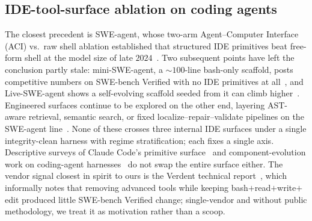 %
%

\subsection{IDE-tool-surface ablation on coding agents}
\label{sec:relwork-ide}

The closest precedent is SWE-agent, whose two-arm Agent--Computer
Interface (ACI) vs.\ raw shell ablation established that structured
IDE primitives beat free-form shell at the model size of late
$2024$~\cite{yang2024sweagent}. Two subsequent points have left the
conclusion partly stale: mini-SWE-agent, a ${\sim}\!100$-line
bash-only scaffold, posts competitive numbers on SWE-bench Verified
with no IDE primitives at all~\cite{repo:miniswagent}, and
Live-SWE-agent shows a self-evolving scaffold seeded from it can climb
higher~\cite{xia2025liveswagent}. Engineered surfaces continue to be explored on the other end, layering
AST-aware retrieval, semantic search, or fixed localize--repair--validate
pipelines on the SWE-agent line~\cite{zhang2024autocoderover,repo:moatless,xia2024agentless}.
None of these crosses three internal IDE surfaces under a single
integrity-clean harness with regime stratification; each fixes a single
axis. Descriptive surveys of Claude Code's primitive
surface~\cite{liu2026divecc,rombaut2026scaffold,bui2026opendev} and
component-evolution work on coding-agent
harnesses~\cite{confuciuscodeagent2025,agenticharnessengineering2026} do
not swap the entire surface either. The vendor signal closest in spirit to ours is the
Verdent technical report~\cite{report:verdent2025swebench}, which
informally notes that removing advanced tools while keeping
bash$+$read$+$write$+$edit produced little SWE-bench Verified change;
single-vendor and without public methodology, we treat it as
motivation rather than a scoop.

